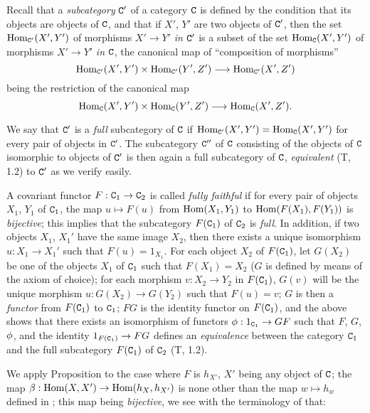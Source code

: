 \begin{env}[8.1.5]
\label{0.8.1.5}
Recall that a \emph{subcategory} $\mathtt{C}'$ of a category $\mathtt{C}$ is defined by the condition that its objects
are objects of $\mathtt{C}$, and that if $X'$, $Y'$ are two objects of $\mathtt{C}'$, then the set
${\mathop{\mathrm{Hom}}\nolimits}_{\mathtt{C}'}(X',Y')$ of morphisms $X'\to Y'$ \emph{in $\mathtt{C}'$} is a subset of the set ${\mathop{\mathrm{Hom}}\nolimits}_\mathtt{C}(X',Y')$ of
morphisms $X'\to Y'$ \emph{in $\mathtt{C}$}, the canonical map of ``composition of morphisms''
\[
  \Hom_{\C'}(X',Y')\times\Hom_{\C'}(Y',Z')\to\Hom_{\C'}(X',Z')
\]
being the restriction of the canonical map
\[
  \Hom_\C(X',Y')\times\Hom_\C(Y',Z')\to\Hom_\C(X',Z').
\]

We say that $\mathtt{C}'$ is a \emph{full} subcategory of $\mathtt{C}$ if ${\mathop{\mathrm{Hom}}\nolimits}_{\mathtt{C}'}(X',Y')={\mathop{\mathrm{Hom}}\nolimits}_\mathtt{C}(X',Y')$ for every
pair of objects in $\mathtt{C}'$. The subcategory $\mathtt{C}''$ of $\mathtt{C}$ consisting of the objects of $\mathtt{C}$ isomorphic to
objects of $\mathtt{C}'$ is then again a full subcategory of $\mathtt{C}$, \emph{equivalent} (T, 1.2) to $\mathtt{C}'$ as we
verify easily.

A covariant functor $F:\C_1\to\C_2$ is called \emph{fully faithful} if for every pair of objects
$X_1$, $Y_1$ of $\mathtt{C}_1$, the map $u\mapsto F(u)$ from ${\mathop{\mathrm{Hom}}\nolimits}(X_1,Y_1)$ to ${\mathop{\mathrm{Hom}}\nolimits}(F(X_1),F(Y_1))$ is
\emph{bijective}; this implies that the subcategory $F(\mathtt{C}_1)$ of $\mathtt{C}_2$ is \emph{full}. In addition,
if two objects $X_1$, $X_1'$ have the same image $X_2$, then there exists a unique isomorphism
$u:X_1\to X_1'$ such that $F(u)=1_{X_1}$. For each object $X_2$ of $F(\mathtt{C}_1)$, let $G(X_2)$ be one of
the objects $X_1$ of $\mathtt{C}_1$ such that $F(X_1)=X_2$ ($G$ is defined by means of the axiom of choice); for
each morphism $v:X_2\to Y_2$ in $F(\mathtt{C}_1)$, $G(v)$ will be the unique morphism $u:G(X_2)\to G(Y_2)$ such
that $F(u)=v$; $G$ is then a \emph{functor} from $F(\mathtt{C}_1)$ to $\mathtt{C}_1$; $FG$ is the identity functor on
$F(\mathtt{C}_1)$, and the above shows that there exists an isomorphism of functors $\vphi:1_{\C_1}\to GF$
such that $F$, $G$, $\phi$, and the identity $1_{F(\C_1)}\to FG$ defines an \emph{equivalence} between
the category $\mathtt{C}_1$ and the full subcategory $F(\mathtt{C}_1)$ of $\mathtt{C}_2$ (T, 1.2).
\end{env}

\begin{env}[8.1.6]
\label{0.8.1.6}
We apply Proposition  to the case where $F$ is $h_{X'}$, $X'$ being any
object of $\mathtt{C}$; the map $\beta:\Hom(X,X')\to\Hom(h_X,h_{X'})$ is none other than the map
$w\mapsto h_w$ defined in ; this map being \emph{bijective}, we see
with the terminology of  that:
\end{env}

